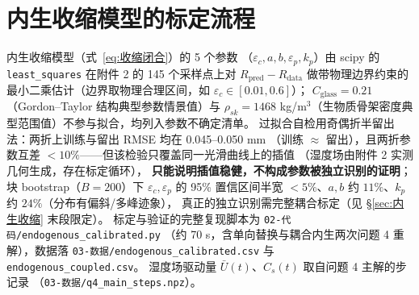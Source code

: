 \documentclass[12pt,a4paper]{ctexart}
\numberwithin{equation}{section}
\begin{document}
\section{内生收缩模型的标定流程}\label{app:内生}
内生收缩模型（式~\eqref{eq:收缩闭合}）的 5 个参数
（$\varepsilon_c,a,b,\varepsilon_p,k_p$）由 scipy 的 \texttt{least\_squares}
在附件 2 的 145 个采样点上对 $R_{\mathrm{pred}}-R_{\mathrm{data}}$ 做带物理边界约束的
最小二乘估计（边界取物理合理区间，如 $\varepsilon_c\in[0.01,0.6]$）；
$C_{\mathrm{glass}}=0.21$（Gordon--Taylor 结构典型参数情景值）与
$\rho_{sk}=1468$ kg/m$^3$（生物质骨架密度典型范围值）不参与拟合，均列入参数不确定清单。
过拟合自检用奇偶折半留出法：两折上训练与留出 RMSE 均在 0.045--0.050 mm
（训练 $\approx$ 留出），且两折参数互差 $<10\%$——但该检验只覆盖同一光滑曲线上的插值
（湿度场由附件 2 实测几何生成，存在标定循环），
\textbf{只能说明插值稳健，不构成参数被独立识别的证明}；
块 bootstrap（$B=200$）下 $\varepsilon_c,\varepsilon_p$ 的 95\% 置信区间半宽
$<5\%$、$a,b$ 约 $11\%$、$k_p$ 约 $24\%$（分布有偏斜/多峰迹象），
真正的独立识别需完整耦合标定（见 \S\ref{sec:内生收缩} 末段限定）。
标定与验证的完整复现脚本为 \texttt{02-代码/endogenous\_calibrated.py}
（约 70 s，含单向替换与耦合内生两次问题 4 重解），数据落
\texttt{03-数据/endogenous\_calibrated.csv} 与 \texttt{endogenous\_coupled.csv}。
湿度场驱动量 $\bar U(t)$、$C_s(t)$ 取自问题 4 主解的步记录
（\texttt{03-数据/q4\_main\_steps.npz}）。
\end{document}
